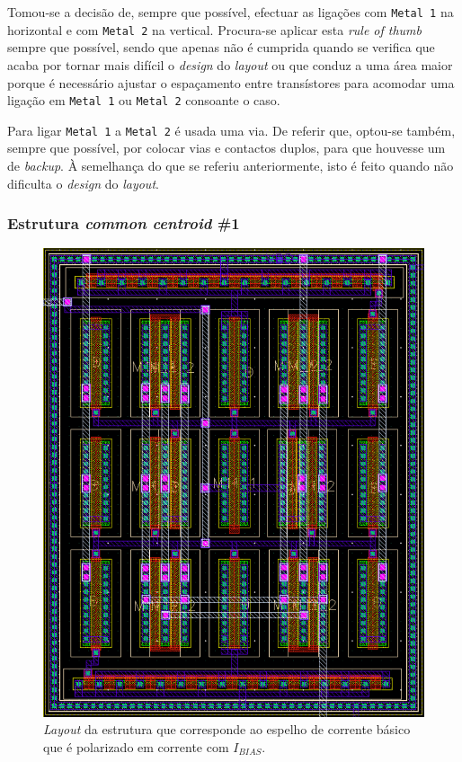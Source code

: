 \documentclass[11pt]{article}
\numberwithin{equation}{section}
\begin{document}
Tomou-se a decisão de, sempre que possível, efectuar as ligações com \texttt{Metal 1} na horizontal e com \texttt{Metal 2} na vertical. Procura-se aplicar esta \textit{rule of thumb} sempre que possível, sendo que apenas não é cumprida quando se verifica que acaba por tornar mais difícil o \textit{design} do \textit{layout} ou que conduz a uma área maior porque é necessário ajustar o espaçamento entre transístores para acomodar uma ligação em \texttt{Metal 1} ou \texttt{Metal 2} consoante o caso.

Para ligar \texttt{Metal 1} a \texttt{Metal 2} é usada uma via. De referir que, optou-se também, sempre que possível, por colocar vias e contactos duplos, para que houvesse um de \textit{backup}. À semelhança do que se referiu anteriormente, isto é feito quando não dificulta o \textit{design} do \textit{layout}.

\subsubsection{Estrutura \textit{common centroid} \#1}

\begin{figure}[H]
	\centering
	\includegraphics[keepaspectratio=true, scale=0.65]{exps/layout/espelhodecorrente}
	\vspace{-0.5em}
	\caption{\textit{Layout} da estrutura que corresponde ao espelho de corrente básico que é polarizado em corrente com $I_{BIAS}$.}
	\vspace{-0.8em}
\end{figure}
\end{document}
